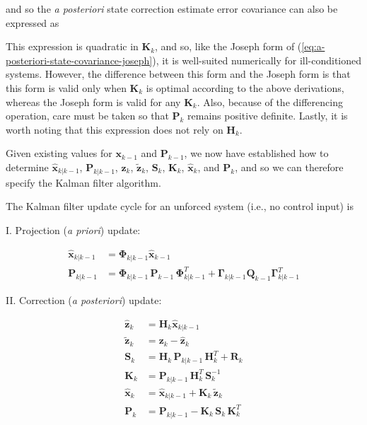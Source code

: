 and so the \textit{a posteriori} state correction estimate error covariance can also be expressed as


This expression is quadratic in $\mathbf{K}_k$, and so, like the Joseph form of
(\ref{eq:a-posteriori-state-covariance-joseph}), it is well-suited numerically for
ill-conditioned systems. However, the difference between this form and the Joseph form
is that this form is valid only when $\mathbf{K}_k$ is optimal according to the above
derivations, whereas the Joseph form is valid for any $\mathbf{K}_k$. Also, because of
the differencing operation, care must be taken so that $\mathbf{P}_k$ remains positive
definite. Lastly, it is worth noting that this expression does not rely on $\mathbf{H}_k$.

Given existing values for $\mathbf{x}_{k-1}$ and $\mathbf{P}_{k-1}$, we now have established
how to determine $\hat{\mathbf{x}}_{k|k-1}$, $\mathbf{P}_{k|k-1}$, $\hat{\mathbf{z}}_{k}$,
$\tilde{\mathbf{z}}_{k}$, $\mathbf{S}_{k}$, $\mathbf{K}_{k}$, $\hat{\mathbf{x}}_k$,
and $\mathbf{P}_k$, and so we can therefore specify the Kalman filter algorithm.

The Kalman filter update cycle for an unforced system (i.e., no control input) is

I. Projection (\textit{a priori}) update:

\begin{equation*}
    \begin{aligned}
        \hat{\mathbf{x}}_{k|k-1} &= \mathbf{\Phi}_{k|k-1} \hat{\mathbf{x}}_{k-1} \\
        \mathbf{P}_{k|k-1} &= \mathbf{\Phi}_{k|k-1} \, \mathbf{P}_{k-1} \, \mathbf{\Phi}_{k|k-1}^T + \mathbf{\Gamma}_{k|k-1} \mathbf{Q}_{k-1} \mathbf{\Gamma}_{k|k-1}^T
    \end{aligned}
\end{equation*}

II. Correction (\textit{a posteriori}) update:

\begin{equation*}
    \begin{aligned}
        \hat{\mathbf{z}}_k &= \mathbf{H}_k \hat{\mathbf{x}}_{k|k-1} \\
        \tilde{\mathbf{z}}_k &= \mathbf{z}_k - \hat{\mathbf{z}}_k \\
        \mathbf{S}_{k} &= \mathbf{H}_{k} \, \mathbf{P}_{k|k-1} \, \mathbf{H}_{k}^T + \mathbf{R}_{k} \\
        \mathbf{K}_{k} &= \mathbf{P}_{k|k-1} \, \mathbf{H}_{k}^T \, \mathbf{S}_{k}^{-1} \\
        \hat{\mathbf{x}}_k &= \hat{\mathbf{x}}_{k|k-1} +\mathbf{K}_k \, \tilde{\mathbf{z}}_k \\
        \mathbf{P}_k &= \mathbf{P}_{k|k-1} - \mathbf{K}_{k} \, \mathbf{S}_{k} \, \mathbf{K}_{k}^T
    \end{aligned}
\end{equation*}

